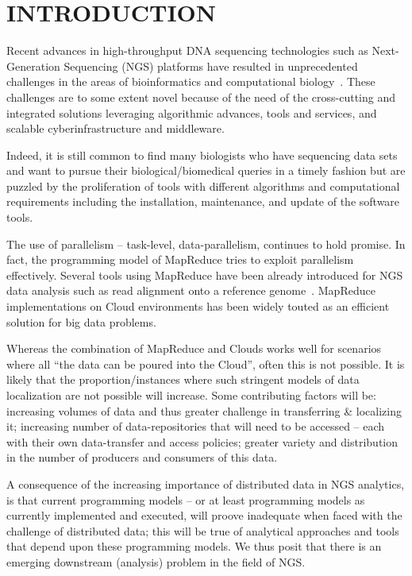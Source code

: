 \documentclass{acm_proc_article-sp}
\begin{document}
\section{INTRODUCTION} 

Recent advances in high-throughput DNA sequencing technologies such as
Next-Generation Sequencing (NGS) platforms have resulted in
unprecedented challenges in the areas of bioinformatics and
computational
biology~\cite{metzker2010,1000genome,wang2009-natrevgen,alex2009,mcpherson2009}.
These challenges are to some extent novel because of the need of the
cross-cutting and integrated solutions leveraging algorithmic
advances, tools and services, and scalable cyberinfrastructure and
middleware.

Indeed, it is still common to find many biologists who have sequencing
data sets and want to pursue their biological/biomedical queries in a
timely fashion but are puzzled by the proliferation of tools with
different algorithms and computational requirements including the
installation, maintenance, and update of the software tools.

The use of parallelism -- task-level, data-parallelism, continues to
hold promise. In fact, the programming model of MapReduce tries to
exploit parallelism effectively.  Several tools using MapReduce have
been already introduced for NGS data analysis such as read alignment
onto a reference genome~\cite{cloudburst,
  gatk,langmead2009,seal2011,langmead2010, taylor2010}.  MapReduce
implementations on Cloud environments has been widely touted as an
efficient solution for big data
problems\cite{mapreduce-2004-dean,schatz-nature-biotech-2010,
  taylor2010}.

Whereas the combination of MapReduce and Clouds works well for
scenarios where all ``the data can be poured into the Cloud'', often
this is not possible.  It is likely that the proportion/instances
where such stringent models of data localization are not possible will
increase.  Some contributing factors will be: increasing volumes of
data and thus greater challenge in transferring \& localizing it;
increasing number of data-repositories that will need to be accessed
-- each with their own data-transfer and access policies; greater
variety and distribution in the number of producers and consumers of
this data. 

A consequence of the increasing importance of distributed data in NGS
analytics, is that current programming models -- or at least
programming models as currently implemented and executed, will proove
inadequate when faced with the challenge of distributed data; this
will be true of analytical approaches and tools that depend upon these
programming models. We thus posit that there is an emerging downstream
(analysis) problem in the field of NGS.
\end{document}
